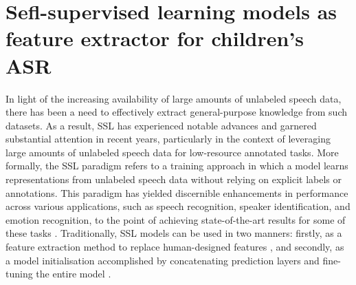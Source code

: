 \chapter{Sefl-supervised learning models as feature extractor for children's \ac{ASR}}
\label{chapter:appendixB}

In light of the increasing availability of large amounts of unlabeled speech data, there has been a need to effectively extract general-purpose knowledge from such datasets. As a result, \ac{SSL} has experienced notable advances and garnered substantial attention in recent years, particularly in the context of leveraging large amounts of unlabeled speech data for low-resource annotated tasks. More formally, the \ac{SSL} paradigm refers to a training approach in which a model learns representations from unlabeled speech data without relying on explicit labels or annotations. This paradigm has yielded discernible enhancements in performance across various applications, such as speech recognition, speaker identification, and emotion recognition, to the point of achieving state-of-the-art results for some of these tasks \cite{baevski2020wav2vec}. Traditionally, \ac{SSL} models can be used in two manners: firstly, as a feature extraction method to replace human-designed features \cite{yang21c_interspeech,chang2021exploration}, and secondly, as a model initialisation accomplished by concatenating prediction layers and fine-tuning the entire model \cite{fan2022draft,jain2023wav2vec2,wang2021fine,li2021accent}.

